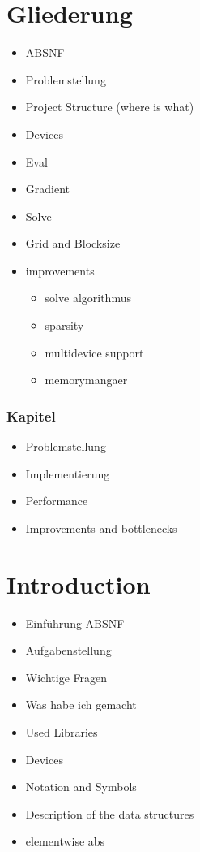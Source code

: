 \section{Gliederung}
\begin{itemize}
	\item ABSNF
	\item Problemstellung
	\item Project Structure (where is what)
	\item Devices
	\item Eval
	\item Gradient
	\item Solve
	\item Grid and Blocksize
	\item improvements
	\begin{itemize}
		\item solve algorithmus
		\item sparsity
		\item multidevice support
		\item memorymangaer
	\end{itemize}
\end{itemize}

\subsubsection{Kapitel}
\begin{itemize}
	\item Problemstellung
	\item Implementierung
	\item Performance
	\item Improvements and bottlenecks
\end{itemize}

\section{Introduction}
\begin{itemize}
	\item Einführung ABSNF
	\item Aufgabenstellung
	\item Wichtige Fragen
	\item Was habe ich gemacht
	\item Used Libraries
	\item Devices
	\item Notation and Symbols
	\item Description of the data structures
	\item elementwise abs
\end{itemize}

